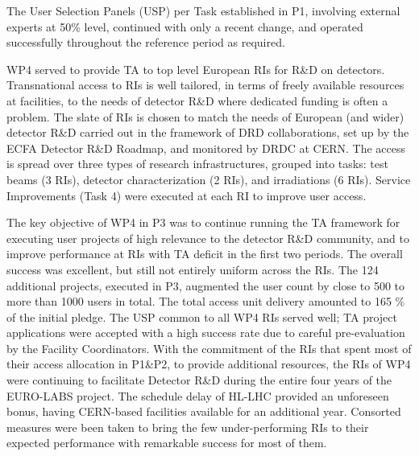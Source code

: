 The User Selection Panels (USP) per Task established in P1, involving external experts at 50\% level,  continued with only a recent change, and operated successfully throughout the reference period as required. 



\begin{prtwo}
\end{prtwo}


WP4 served to provide TA to top level European RIs for R\&D on detectors. Transnational access to RIs is well tailored, in terms of freely available resources at facilities, to the needs of detector R\&D where dedicated funding is often a problem. The slate of RIs is chosen to match the needs of European (and wider) detector R\&D carried out in the framework of DRD collaborations, set up by the ECFA Detector R\&D Roadmap, and monitored by DRDC at CERN. The access is spread over three types of research infrastructures, grouped into tasks: test beams (3 RIs), detector characterization (2 RIs), and irradiations (6 RIs). Service Improvements (Task 4) were executed at each RI to improve user access.

The key objective of WP4 in P3 was to continue running the TA framework for executing user projects of high relevance to the detector R\&D community, and to improve performance at RIs with TA deficit in the first two periods. The overall success was excellent, but still not entirely uniform across the RIs. The 124 additional projects, executed in P3, augmented the user count by close to 500 to more than 1000 users in total. The total access unit delivery amounted to 165 \% of the initial pledge. The USP common to all WP4 RIs served well; TA project applications were accepted with a high success rate due to careful pre-evaluation by the Facility Coordinators. With the commitment of the RIs that spent most of their access allocation in P1\&P2, to provide additional resources, the RIs of WP4 were continuing to facilitate Detector R\&D during the entire four years of the EURO-LABS project. The schedule delay of HL-LHC provided an unforeseen bonus, having CERN-based facilities available for an additional year. Consorted measures were been taken to bring the few under-performing RIs to their expected performance with remarkable success for most of them.



